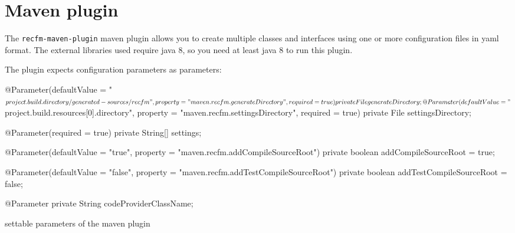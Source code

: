 \chapter{Maven plugin}\label{sec:maven}
The \verb!recfm-maven-plugin! maven plugin allows you to create multiple classes 
and interfaces using one or more configuration files in yaml format. 
The external libraries used require java 8, so you need at least java 8 to run 
this plugin.

The plugin expects configuration parameters as parameters:
\begin{elisting}[!htb]
\begin{javacode}
    @Parameter(defaultValue = "${project.build.directory}/generated-sources/recfm",
        property = "maven.recfm.generateDirectory", required = true)
    private File generateDirectory;

    @Parameter(defaultValue = "${project.build.resources[0].directory}",
        property = "maven.recfm.settingsDirectory", required = true)
    private File settingsDirectory;
    
    @Parameter(required = true)
    private String[] settings;

    @Parameter(defaultValue = "true", property = "maven.recfm.addCompileSourceRoot")
    private boolean addCompileSourceRoot = true;

    @Parameter(defaultValue = "false", property = "maven.recfm.addTestCompileSourceRoot")
    private boolean addTestCompileSourceRoot = false;
    
    @Parameter
    private String codeProviderClassName;
\end{javacode}
\caption{settable parameters of the maven plugin}
\label{lst:maven.conf}
\end{elisting}

